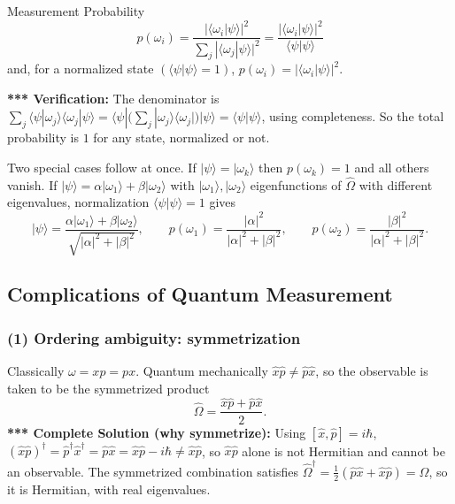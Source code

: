 \documentclass[11pt,a4paper]{article}
\begin{document}
\begin{thm}{Measurement Probability}
\[
p(\omega_i)=\frac{|\langle\omega_i|\psi\rangle|^2}{\sum_j|\langle\omega_j|\psi\rangle|^2}=\frac{|\langle\omega_i|\psi\rangle|^2}{\langle\psi|\psi\rangle}
\]
and, for a normalized state $(\langle\psi|\psi\rangle=1)$, $p(\omega_i)=|\langle\omega_i|\psi\rangle|^2$.
\end{thm}
\textbf{*** Verification:} The denominator is $\sum_j\langle\psi|\omega_j\rangle\langle\omega_j|\psi\rangle=\langle\psi|\Big(\sum_j|\omega_j\rangle\langle\omega_j|\Big)|\psi\rangle=\langle\psi|\psi\rangle$, using completeness. So the total probability is $1$ for any state, normalized or not.

Two special cases follow at once. If $|\psi\rangle=|\omega_k\rangle$ then $p(\omega_k)=1$ and all others vanish. If $|\psi\rangle=\alpha|\omega_1\rangle+\beta|\omega_2\rangle$ with $|\omega_1\rangle,|\omega_2\rangle$ eigenfunctions of $\hat\Omega$ with different eigenvalues, normalization $\langle\psi|\psi\rangle=1$ gives
\[
|\psi\rangle=\frac{\alpha|\omega_1\rangle+\beta|\omega_2\rangle}{\sqrt{|\alpha|^2+|\beta|^2}},\qquad
p(\omega_1)=\frac{|\alpha|^2}{|\alpha|^2+|\beta|^2},\qquad
p(\omega_2)=\frac{|\beta|^2}{|\alpha|^2+|\beta|^2}.
\]

\subsection{Complications of Quantum Measurement}
\subsubsection*{(1) Ordering ambiguity: symmetrization}
Classically $\omega=xp=px$. Quantum mechanically $\hat x\hat p\neq\hat p\hat x$, so the observable is taken to be the symmetrized product
\[
\hat\Omega=\frac{\hat x\hat p+\hat p\hat x}{2}.
\]
\textbf{*** Complete Solution (why symmetrize):} Using $[\hat x,\hat p]=i\hbar$, $(\hat x\hat p)^\dagger=\hat p^\dagger\hat x^\dagger=\hat p\hat x=\hat x\hat p-i\hbar\neq\hat x\hat p$, so $\hat x\hat p$ alone is not Hermitian and cannot be an observable. The symmetrized combination satisfies $\hat\Omega^\dagger=\tfrac12(\hat p\hat x+\hat x\hat p)=\hat\Omega$, so it is Hermitian, with real eigenvalues.
\end{document}
